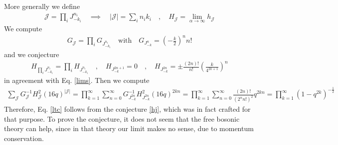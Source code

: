 \documentclass[12pt,a4paper]{article}
\begin{document}
More generally we define 
\begin{align}
 \mathcal{J} = \prod_i J_{-k_i}^{n_i}  \quad \implies \quad |\mathcal{J}| = \sum_i n_ik_i \quad , \quad 
 H_\mathcal{J} = \lim_{\alpha\to \infty} h_\mathcal{J}
\end{align}
We compute 
\begin{align}
 G_\mathcal{J} = \prod_i G_{J_{-k_i}^{n_i}} \quad \text{with} \quad G_{J_{-k}^n} = 
 \left(-\frac{k}{2}\right)^{n} n! 
\end{align}
and we conjecture 
\begin{align}
 H_{\prod_i J_{-k_i}^{n_i}} = \prod_i H_{J_{-k_i}^{n_i}} 
\quad , \quad 
 H_{J_{-k}^{2n+1}} = 0 \quad , \quad H_{J_{-k}^{2n}} = \pm \frac{(2n)!}{n!} \left(\frac{k}{4^{2k+1}}\right)^n 
\label{hj}
 \end{align}
 in agreement with Eq. \eqref{lims}. 
Then we compute 
\begin{align}
 \sum_\mathcal{J} G_\mathcal{J}^{-1} H_\mathcal{J}^2 (16q)^{|\mathcal{J}|} = \prod_{k=1}^\infty \sum_{n=0}^\infty G^{-1}_{J_{-k}^{2n}} H_{J_{-k}^{2n}}^2 (16q)^{2kn} 
 = \prod_{k=1}^\infty \sum_{n=0}^\infty \frac{(2n)!}{(2^nn!)^2} q^{2kn} = \prod_{k=1}^\infty \left(1-q^{2k}\right)^{-\frac12}
\end{align}
Therefore, Eq. \eqref{ltc} follows from the conjecture \eqref{hj}, which was in fact crafted for that purpose. To prove the conjecture, it does not seem that the free bosonic theory can help, since in that theory our limit makes no sense, due to momentum conservation. 




\end{document}
